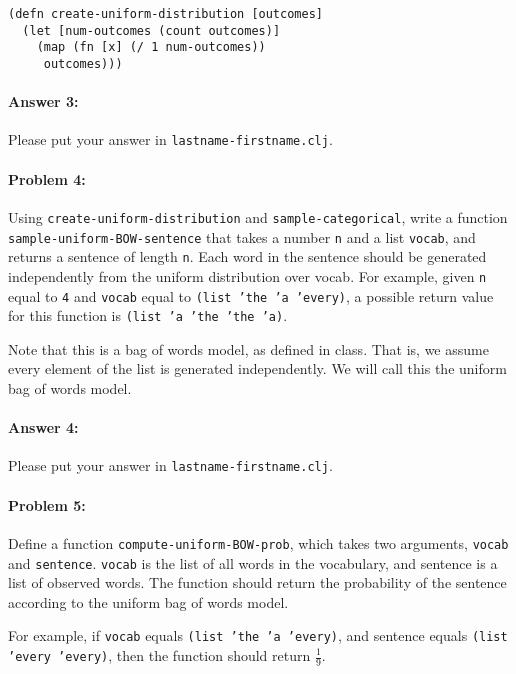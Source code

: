 \documentclass[10pt]{article}
\begin{document}
\begin{lstlisting}
(defn create-uniform-distribution [outcomes]
  (let [num-outcomes (count outcomes)]
    (map (fn [x] (/ 1 num-outcomes))
	 outcomes)))
\end{lstlisting}


\paragraph{Answer 3:} Please put your answer in \texttt{lastname-firstname.clj}.

\hrulefill
\paragraph{Problem 4:}

Using \texttt{create-uniform-distribution} and
\texttt{sample-categorical}, write a function
\texttt{sample-uniform-BOW-sentence} that takes a number \texttt{n}
and a list \texttt{vocab}, and returns a sentence of length
\texttt{n}. Each word in the sentence should be generated
independently from the uniform distribution over vocab. For example,
given \texttt{n} equal to \texttt{4} and \texttt{vocab} equal to
\texttt{(list 'the 'a 'every)}, a possible return value for this
function is \texttt{(list 'a 'the 'the 'a)}.

Note that this is a bag of words model, as defined in class. That is,
we assume every element of the list is generated independently. We
will call this the uniform bag of words model.

\paragraph{Answer 4:} Please put your answer in
\texttt{lastname-firstname.clj}.

\hrulefill
\paragraph{Problem 5:}

Define a function \texttt{compute-uniform-BOW-prob}, which takes two
arguments, \texttt{vocab} and \texttt{sentence}. \texttt{vocab} is the
list of all words in the vocabulary, and sentence is a list of
observed words. The function should return the probability of the
sentence according to the uniform bag of words model.

For example, if \texttt{vocab} equals \texttt{(list 'the 'a 'every)},
and sentence equals \texttt{(list 'every 'every)}, then the function
should return $\frac{1}{9}$.
\end{document}
